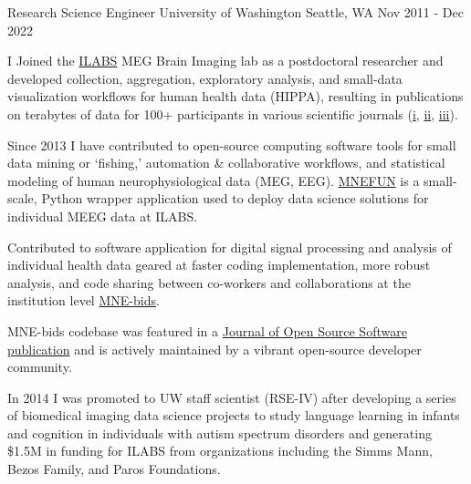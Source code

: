 

\begin{cventries}

  \cventry
  {Research Science Engineer} %
  {University of Washington} %
  {Seattle, WA} %
  {Nov 2011 - Dec 2022} %
  {
    \begin{cvitems} %
      \item {I Joined the \href{https://ilabs.uw.edu/}{ILABS} MEG Brain Imaging lab as a postdoctoral researcher and developed collection, aggregation, exploratory analysis, and small-data visualization workflows for human health data (HIPPA), resulting in publications on terabytes of data for 100+ participants in various scientific journals (\href{https://doi.org/10.1111/desc.12427}{i}, \href{https://doi.org/10.1016/j.dcn.2020.100901}{ii}, \href{https://doi.org/10.1121/1.5137262}{iii}).}
      \item {Since 2013 I have contributed to open-source computing software tools for small data mining or `fishing,' automation \& collaborative workflows, and statistical modeling of human neurophysiological data (MEG, EEG). \href{https://github.com/LABSN/mnefun}{MNEFUN} is a small-scale, Python wrapper application used to deploy data science solutions for individual MEEG data at ILABS.}
      \item {Contributed to software application for digital signal processing and analysis of individual health data geared at faster coding implementation, more robust analysis, and code sharing between co-workers and collaborations at the institution level \href{https://mne.tools/mne-bids/}{MNE-bids}.}
      \item {MNE-bids codebase was featured in a \href{https://joss.theoj.org/papers/10.21105/joss.01896}{Journal of Open Source Software publication} and is actively maintained by a vibrant open-source developer community.}
      \item {In 2014 I was promoted to UW staff scientist (RSE-IV) after developing a series of biomedical imaging data science projects to study language learning in infants and cognition in individuals with autism spectrum disorders and generating \$1.5M in funding for ILABS from organizations including the Simms Mann, Bezos Family, and Paros Foundations.}

\end{cvitems}}
\end{cventries}
